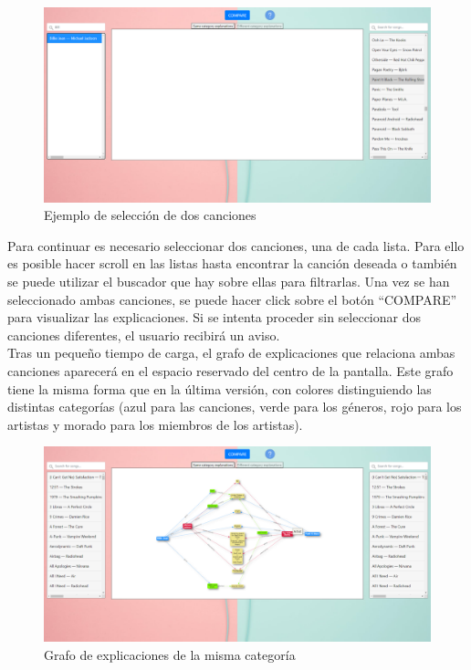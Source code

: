 \begin{figure}[h!]
	\centering
	\includegraphics[width = 1\textwidth]{Imagenes/Bitmap/Pantalla seleccion.png}
	\caption{Ejemplo de selección de dos canciones}
	\label{fig:sampleImage}
\end{figure}

Para continuar es necesario seleccionar dos canciones, una de cada lista. Para ello es posible hacer scroll en las listas hasta encontrar la canción deseada o también se puede utilizar el buscador que hay sobre ellas para filtrarlas. Una vez se han seleccionado ambas canciones, se puede hacer click sobre el botón ``COMPARE'' para visualizar las explicaciones. Si se intenta proceder sin seleccionar dos canciones diferentes, el usuario recibirá un aviso.\\

Tras un pequeño tiempo de carga, el grafo de explicaciones que relaciona ambas canciones aparecerá en el espacio reservado del centro de la pantalla. Este grafo tiene la misma forma que en la última versión, con colores distinguiendo las distintas categorías (azul para las canciones, verde para los géneros, rojo para los artistas y morado para los miembros de los artistas).\\

\clearpage

\begin{figure}[h!]
	\centering
	\includegraphics[width = 1\textwidth]{Imagenes/Bitmap/Pantalla same graph.png}
	\caption{Grafo de explicaciones de la misma categoría}
	\label{fig:sampleImage}
\end{figure}

